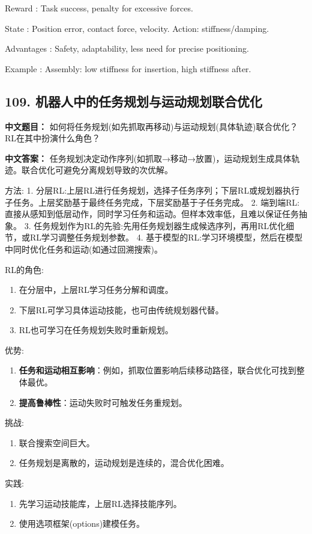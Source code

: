 \documentclass[10pt,a4paper]{ctexart}
\begin{document}
 Reward : Task success, penalty for excessive forces.

 State : Position error, contact force, velocity. Action: stiffness/damping.

 Advantages : Safety, adaptability, less need for precise positioning.

 Example : Assembly: low stiffness for insertion, high stiffness after.

\subsection*{109. 机器人中的任务规划与运动规划联合优化}
\textbf{中文题目：} 如何将任务规划(如先抓取再移动)与运动规划(具体轨迹)联合优化？RL在其中扮演什么角色？

\textbf{中文答案：}  
任务规划决定动作序列(如抓取→移动→放置)，运动规划生成具体轨迹。联合优化可避免分离规划导致的次优解。

 方法:
1.  分层RL:上层RL进行任务规划，选择子任务序列；下层RL或规划器执行子任务。上层奖励基于最终任务完成，下层奖励基于子任务完成。
2.  端到端RL:直接从感知到低层动作，同时学习任务和运动。但样本效率低，且难以保证任务抽象。
3.  任务规划作为RL的先验:先用任务规划器生成候选序列，再用RL优化细节，或RL学习调整任务规划参数。
4.  基于模型的RL:学习环境模型，然后在模型中同时优化任务和运动(如通过回溯搜索)。

 RL的角色:
\begin{enumerate}
    \item 在分层中，上层RL学习任务分解和调度。
    \item 下层RL可学习具体运动技能，也可由传统规划器代替。
    \item RL也可学习在任务规划失败时重新规划。
\end{enumerate}

 优势:
\begin{enumerate}
    \item \textbf{任务和运动相互影响}：例如，抓取位置影响后续移动路径，联合优化可找到整体最优。
    \item \textbf{提高鲁棒性}：运动失败时可触发任务重规划。
\end{enumerate}

 挑战:
\begin{enumerate}
    \item 联合搜索空间巨大。
    \item 任务规划是离散的，运动规划是连续的，混合优化困难。
\end{enumerate}

 实践:
\begin{enumerate}
    \item 先学习运动技能库，上层RL选择技能序列。
    \item 使用选项框架(options)建模任务。
\end{enumerate}
\end{document}
